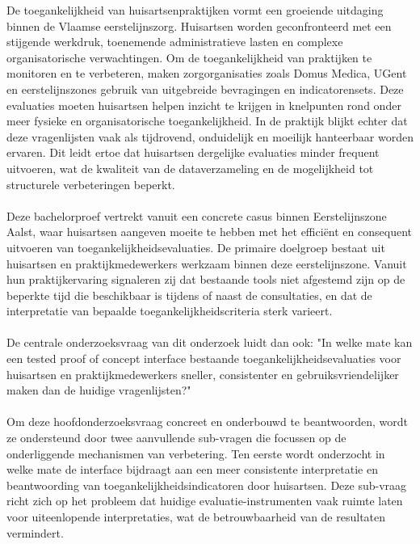 De toegankelijkheid van huisartsenpraktijken vormt een groeiende uitdaging binnen de Vlaamse eerstelijnszorg.
Huisartsen worden geconfronteerd met een stijgende werkdruk, toenemende administratieve lasten en complexe organisatorische verwachtingen.
Om de toegankelijkheid van praktijken te monitoren en te verbeteren, maken zorgorganisaties zoals Domus Medica, UGent en eerstelijnszones gebruik van uitgebreide bevragingen en indicatorensets.
Deze evaluaties moeten huisartsen helpen inzicht te krijgen in knelpunten rond onder meer fysieke en organisatorische toegankelijkheid.
In de praktijk blijkt echter dat deze vragenlijsten vaak als tijdrovend, onduidelijk en moeilijk hanteerbaar worden ervaren.
Dit leidt ertoe dat huisartsen dergelijke evaluaties minder frequent uitvoeren, wat de kwaliteit van de dataverzameling en de mogelijkheid tot structurele verbeteringen beperkt.\\\\

Deze bachelorproef vertrekt vanuit een concrete casus binnen Eerstelijnszone Aalst, waar huisartsen aangeven moeite te hebben met het efficiënt en consequent uitvoeren van toegankelijkheidsevaluaties.
De primaire doelgroep bestaat uit huisartsen en praktijkmedewerkers werkzaam binnen deze eerstelijnszone.
Vanuit hun praktijkervaring signaleren zij dat bestaande tools niet afgestemd zijn op de beperkte tijd die beschikbaar is tijdens of naast de consultaties, en dat de interpretatie van bepaalde toegankelijkheidscriteria sterk varieert.\\\\

De centrale onderzoeksvraag van dit onderzoek luidt dan ook:
"In welke mate kan een tested proof of concept interface bestaande toegankelijkheidsevaluaties voor huisartsen en praktijkmedewerkers sneller, consistenter en gebruiksvriendelijker maken dan de huidige vragenlijsten?"\\\\

Om deze hoofdonderzoeksvraag concreet en onderbouwd te beantwoorden, 
wordt ze ondersteund door twee aanvullende sub-vragen die focussen op de onderliggende mechanismen van verbetering.
Ten eerste wordt onderzocht in welke mate de interface bijdraagt aan een meer consistente interpretatie en beantwoording van toegankelijkheidsindicatoren door huisartsen.
Deze sub-vraag richt zich op het probleem dat huidige evaluatie-instrumenten vaak ruimte laten voor uiteenlopende interpretaties, wat de betrouwbaarheid van de resultaten vermindert.\\\\

